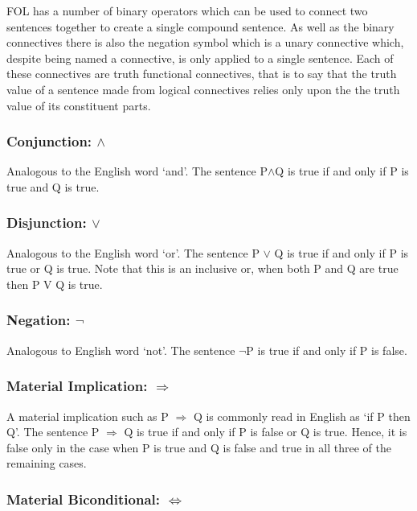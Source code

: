 FOL has a number of binary operators which can be used to connect two sentences together to create a single compound sentence. As well as the binary connectives there is also the negation symbol which is a unary connective which, despite being named a connective, is only applied to a single sentence. Each of these connectives are truth functional connectives, that is to say that the truth value of a sentence made from logical connectives relies only upon the the truth value of its constituent parts.

\subsubsection*{Conjunction: $\land$}

Analogous to the English word `and'. The sentence P$ \land $Q is true if and only if P is true and Q is true.

\subsubsection*{Disjunction: $\lor$}

Analogous to the English word `or'. The sentence P $\lor$ Q is true if and only if P is true or Q is true. Note that this is an inclusive or, when both P and Q are true then P V Q is true.

\subsubsection*{Negation: $\lnot$}

Analogous to English word `not'. The sentence $\lnot $P is true if and only if P is false.

\subsubsection*{Material Implication: $\Rightarrow$}

A material implication such as  P $\Rightarrow $ Q is commonly read in English as `if P then Q'. The sentence P $ \Rightarrow $ Q is true if and only if P is false or Q is true. Hence, it is false only in the case when P is true and Q is false and true in all three of the remaining cases. 

\subsubsection*{Material Biconditional: $\Leftrightarrow$}

